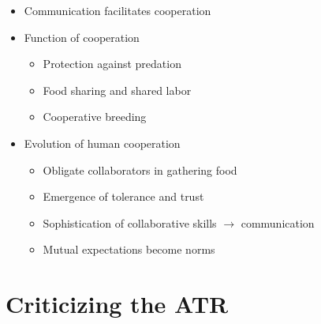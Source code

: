 \documentclass[xcolor=table]{beamer}       %
\begin{document}
\begin{frame}{\insertsection}
    \begin{itemize}
        \item Communication facilitates cooperation
        \item Function of cooperation
            \begin{itemize}
                \item Protection against predation
                \item Food sharing and shared labor
                \item Cooperative breeding
            \end{itemize}
        \item Evolution of human cooperation
            \begin{itemize}
                \item Obligate collaborators in gathering food
                \item Emergence of tolerance and trust
                \item Sophistication of collaborative skills $\to$ communication
                \item Mutual expectations become norms
            \end{itemize}
    \end{itemize}

    \vfill

    \hfill \footnotesize{\citep{Tomasello09}}
\end{frame}

\section{Criticizing the ATR}
\end{document}

